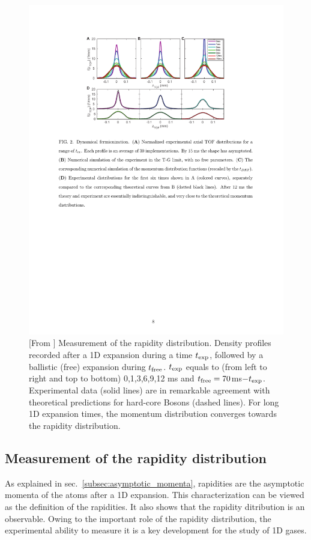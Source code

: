 \documentclass[onecolumn,amsfonts,showpacs,superscriptaddress]{revtex4-1}
\begin{document}
\begin{figure}
    \centering
    \includegraphics[viewport=134 480 475 593,clip]{figures/ArticleWeiss_p8.pdf}
    \caption{[From \cite{wilson_observation_2020}] Measurement of the rapidity distribution.
    Density profiles recorded after a 1D expansion during a time $t_{\rm{exp}}$, followed by a ballistic (free) expansion during $t_{{\rm free}}$.
    $t_{\rm exp}$ equals to (from left to right and top to bottom) 0,1,3,6,9,12 ms and $t_{\rm free}=70$ms$-t_{\rm exp}$. 
    Experimental data (solid lines) are in remarkable agreement with theoretical predictions for hard-core Bosons (dashed lines). For long 1D expansion times, the momentum distribution converges towards the rapidity distribution. }
    \label{fig:measurement_rapidity_distribution}
\end{figure}

\subsection{Measurement of the rapidity distribution}
\label{subsec:rapidity_dist_measurement}
As explained in sec.~\ref{subsec:asymptotic_momenta}, rapidities are the asymptotic momenta of the atoms after a 1D expansion. This 
characterization can be viewed as the definition of the rapidities. 
It also shows that the rapidity ditribution is an observable.
Owing to the important role of the rapidity distribution, the experimental ability to  measure it is a key development for the study of 1D gases. 
\end{document}
